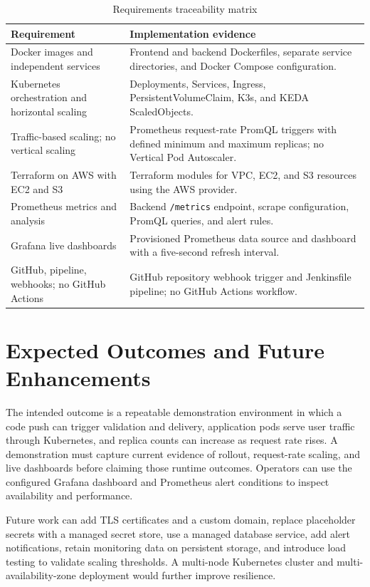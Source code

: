 \documentclass[12pt,a4paper]{article}
\begin{document}
\begin{table}[htbp]
\caption{Requirements traceability matrix}
\label{tab:traceability}
\centering
\begin{tabular}{p{}p{}}
\hline
\textbf{Requirement} & \textbf{Implementation evidence} \\
\hline
Docker images and independent services & Frontend and backend Dockerfiles, separate service directories, and Docker Compose configuration. \\
Kubernetes orchestration and horizontal scaling & Deployments, Services, Ingress, PersistentVolumeClaim, K3s, and KEDA ScaledObjects. \\
Traffic-based scaling; no vertical scaling & Prometheus request-rate PromQL triggers with defined minimum and maximum replicas; no Vertical Pod Autoscaler. \\
Terraform on AWS with EC2 and S3 & Terraform modules for VPC, EC2, and S3 resources using the AWS provider. \\
Prometheus metrics and analysis & Backend \texttt{/metrics} endpoint, scrape configuration, PromQL queries, and alert rules. \\
Grafana live dashboards & Provisioned Prometheus data source and dashboard with a five-second refresh interval. \\
GitHub, pipeline, webhooks; no GitHub Actions & GitHub repository webhook trigger and Jenkinsfile pipeline; no GitHub Actions workflow. \\
\hline
\end{tabular}
\end{table}

\section{Expected Outcomes and Future Enhancements}
The intended outcome is a repeatable demonstration environment in which a code push can trigger validation and delivery, application pods serve user traffic through Kubernetes, and replica counts can increase as request rate rises. A demonstration must capture current evidence of rollout, request-rate scaling, and live dashboards before claiming those runtime outcomes. Operators can use the configured Grafana dashboard and Prometheus alert conditions to inspect availability and performance.

Future work can add TLS certificates and a custom domain, replace placeholder secrets with a managed secret store, use a managed database service, add alert notifications, retain monitoring data on persistent storage, and introduce load testing to validate scaling thresholds. A multi-node Kubernetes cluster and multi-availability-zone deployment would further improve resilience.
\end{document}
